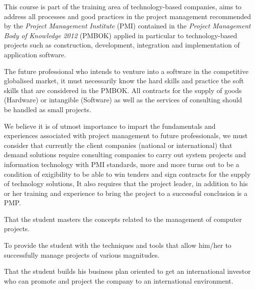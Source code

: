 \begin{syllabus}


\begin{justification}
This course is part of the training area of technology-based companies, 
aims to address all processes and good practices in the 
project management recommended by the \textit{Project Management Institute} (PMI) 
contained in the \textit{Project Management Body of Knowledge 2012} (PMBOK)  
applied in particular to technology-based projects such as 
construction, development, integration and implementation of 
application software.

The future professional who intends to venture into a 
software in the competitive globalised market, it must necessarily 
know the hard skills and practice the soft skills that are 
considered in the PMBOK. All contracts for the supply of goods 
(Hardware) or intangible (Software) as well as the services of 
consulting should be handled as small projects.

We believe it is of utmost importance to impart the fundamentals and experiences 
associated with project management to future professionals, 
we must consider that currently the client companies 
(national or international) that demand solutions require 
consulting companies to carry out system projects 
and information technology with PMI standards, 
more and more turns out to be a condition of exigibility to be able to win 
tenders and sign contracts for the supply of technology solutions, 
It also requires that the project leader, in addition to his or her training and 
experience to bring the project to a successful conclusion is a PMP.
\end{justification}

\begin{goals}
\item That the student masters the concepts related to the management of computer projects.
\item To provide the student with the techniques and tools that allow him/her to successfully manage projects of various magnitudes.
\item That the student builds his business plan oriented to get an international investor who can promote and project the company to an international environment.
\end{goals}


\end{syllabus}
